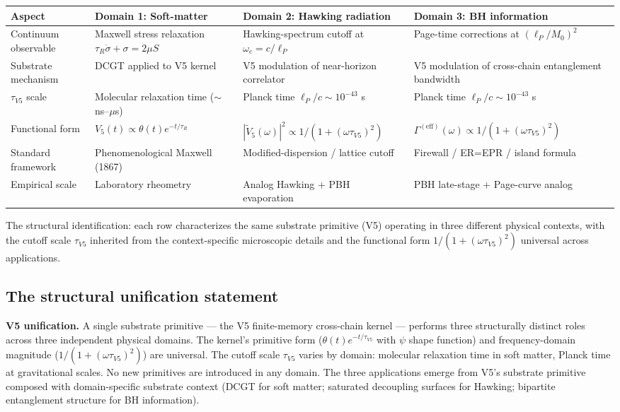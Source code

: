 \documentclass[11pt,a4paper]{article}
\begin{document}
\begin{center}
\footnotesize
\begin{tabular}{p{}p{}p{}p{}}
\toprule
\textbf{Aspect} & \textbf{Domain 1: Soft-matter} & \textbf{Domain 2: Hawking radiation} & \textbf{Domain 3: BH information} \\
\midrule
Continuum observable & Maxwell stress relaxation $\tau_R \dot\sigma + \sigma = 2\mu S$ & Hawking-spectrum cutoff at $\omega_c = c/\ell_P$ & Page-time corrections at $(\ell_P/M_0)^{2}$ \\
Substrate mechanism & DCGT applied to V5 kernel & V5 modulation of near-horizon correlator & V5 modulation of cross-chain entanglement bandwidth \\
$\tau_{V5}$ scale & Molecular relaxation time ($\sim$ ns--$\mu$s) & Planck time $\ell_P/c \sim 10^{-43}$ s & Planck time $\ell_P/c \sim 10^{-43}$ s \\
Functional form & $V_5(t) \propto \theta(t) e^{-t/\tau_R}$ & $|\tilde V_5(\omega)|^{2} \propto 1/(1+(\omega\tau_{V5})^{2})$ & $\Gamma^{(\mathrm{eff})}(\omega) \propto 1/(1+(\omega\tau_{V5})^{2})$ \\
Standard framework & Phenomenological Maxwell (1867) & Modified-dispersion / lattice cutoff & Firewall / ER=EPR / island formula \\
Empirical scale & Laboratory rheometry & Analog Hawking + PBH evaporation & PBH late-stage + Page-curve analog \\
\bottomrule
\end{tabular}
\end{center}

The structural identification: each row characterizes the same substrate primitive (V5) operating in three different physical contexts, with the cutoff scale $\tau_{V5}$ inherited from the context-specific microscopic details and the functional form $1/(1+(\omega\tau_{V5})^{2})$ universal across applications.

\subsection{The structural unification statement}

\textbf{V5 unification.} A single substrate primitive --- the V5 finite-memory cross-chain kernel --- performs three structurally distinct roles across three independent physical domains. The kernel's primitive form ($\theta(t) e^{-t/\tau_{V5}}$ with $\psi$ shape function) and frequency-domain magnitude ($1/(1+(\omega\tau_{V5})^{2})$) are universal. The cutoff scale $\tau_{V5}$ varies by domain: molecular relaxation time in soft matter, Planck time at gravitational scales. No new primitives are introduced in any domain. The three applications emerge from V5's substrate primitive composed with domain-specific substrate context (DCGT for soft matter; saturated decoupling surfaces for Hawking; bipartite entanglement structure for BH information).
\end{document}
